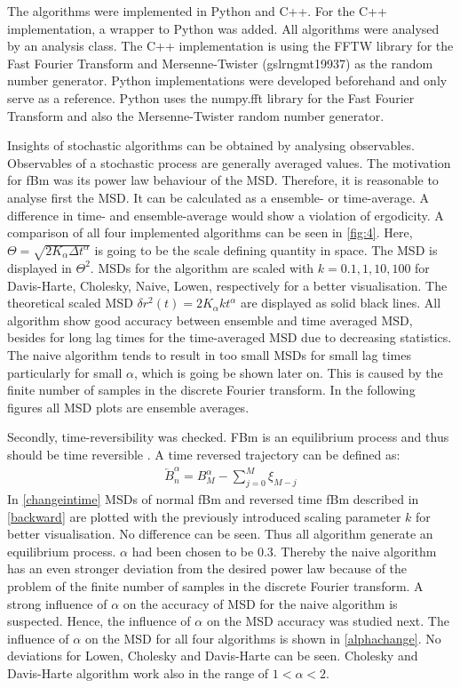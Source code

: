 \documentclass[
  a4paper,BCOR10mm,twoside,
  headsepline,footsepline,%
  fleqn,openbib
]{scrbook}
\begin{document}
The algorithms were implemented in Python and C++. For the C++ implementation, a wrapper to Python was added. All algorithms were analysed by an analysis class. The C++ implementation is using the FFTW library for the Fast Fourier Transform \cite{FFTW} and Mersenne-Twister (gsl\texttt{\textunderscore}rng\texttt{\textunderscore}mt19937) \cite{Matsumoto1998} as the random number generator. Python implementations were developed beforehand and only serve as a reference. Python uses the numpy.fft library for the Fast Fourier Transform and also the Mersenne-Twister random number generator.\par
Insights of stochastic algorithms can be obtained by analysing observables. Observables of a stochastic process are generally averaged values. The motivation for fBm was its power law behaviour of the MSD. Therefore, it is reasonable to analyse first the MSD. It can be calculated as a ensemble- or time-average. A difference in time- and ensemble-average would show a violation of ergodicity. A comparison of all four implemented algorithms can be seen in \cref{fig:4}. Here, $\Theta=\sqrt{2K_\alpha \Delta t^{\alpha}}$ is going to be the scale defining quantity in space. The MSD is displayed in $\Theta^2$. MSDs for the algorithm are scaled with $k=0.1,1,10,100$ for Davis-Harte, Cholesky, Naive, Lowen, respectively for a better visualisation. The theoretical scaled MSD $\delta r^2 (t)=2 K_\alpha k t^{\alpha}$ are displayed as solid black lines. All algorithm show good accuracy between ensemble and time averaged MSD, besides for long lag times for the time-averaged MSD due to decreasing statistics. The naive algorithm tends to result in too small MSDs for small lag times particularly for small $\alpha$, which is going be shown later on. This is caused by the finite number of samples in the discrete Fourier transform. In the following figures all MSD plots are ensemble averages.\par Secondly, time-reversibility was checked. FBm is an equilibrium process and thus should be time reversible  \cite{Horvai2007}. A time reversed trajectory can be defined as:
\begin{align} \label{backward}
 \overleftarrow{B}^{\alpha}_n=B^{\alpha}_M-\sum^M_{j=0} \xi_{M-j}
\end{align}
In \cref{changeintime}  MSDs of normal fBm and reversed time fBm described in \cref{backward} are plotted with the previously introduced scaling parameter $k$ for better visualisation. No difference can be seen. Thus all algorithm generate an equilibrium process. $\alpha$ had been chosen to be $0.3$. Thereby the naive algorithm has an even stronger deviation from the desired power law because of the problem of the finite number of samples in the discrete Fourier transform. A strong influence of $\alpha$ on the accuracy of MSD for the naive algorithm is suspected. Hence, the influence of $\alpha$ on the MSD accuracy was studied next. The influence of $\alpha$ on the MSD for all four algorithms is shown in \cref{alphachange}. No deviations for Lowen, Cholesky and Davis-Harte can be seen. Cholesky and Davis-Harte algorithm work also in the range of $1<\alpha<2$. 
\end{document}
